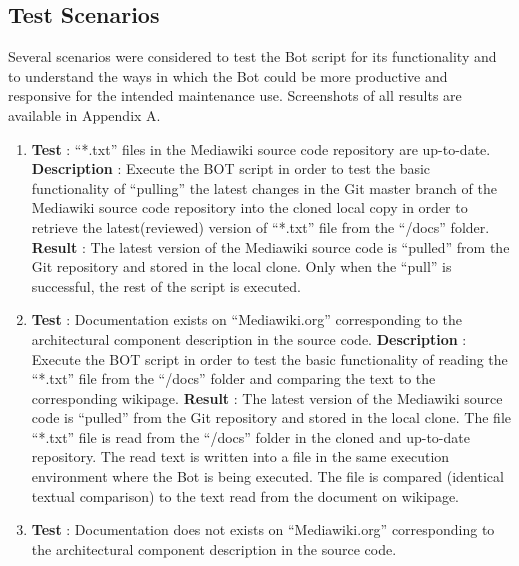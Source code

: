 \subsection{Test Scenarios}
Several scenarios were considered to test the Bot script for its functionality and to understand the ways in which the Bot could be more productive and responsive for the intended maintenance use. Screenshots of all results are available in Appendix A.
\begin{enumerate} 
\item \textbf{Test} : \enquote{*.txt} files in the Mediawiki source code repository are up-to-date.
\newline
\newline \textbf{Description} : Execute the BOT script in order to test the basic functionality of \enquote{pulling} the latest changes in the Git master branch of the Mediawiki source code repository into the cloned local copy in order to retrieve the latest(reviewed) version of \enquote{*.txt} file from the \enquote{/docs} folder.
\newline 
\newline \textbf{Result} : The latest version of the Mediawiki source code is \enquote{pulled} from the Git repository and stored in the local clone. Only when the \enquote{pull} is successful, the rest of the script is executed.
\newline
\item \textbf{Test} : Documentation exists on \enquote{Mediawiki.org} corresponding to the architectural component description in the source code.
\newline
\newline \textbf{Description} : Execute the BOT script in order to test the basic functionality of reading the \enquote{*.txt} file from the \enquote{/docs} folder and comparing the text to the corresponding wikipage.
\newline 
\newline \textbf{Result} : The latest version of the Mediawiki source code is \enquote{pulled} from the Git repository and stored in the local clone. The file \enquote{*.txt} file is read from the \enquote{/docs} folder in the cloned and up-to-date repository. The read text is written into a file in the same execution environment where the Bot is being executed. The file is compared (identical textual comparison) to the text read from the document on wikipage.
\newline
\item \textbf{Test} : Documentation does not exists on \enquote{Mediawiki.org} corresponding to the architectural component description in the source code.

\end{enumerate}

